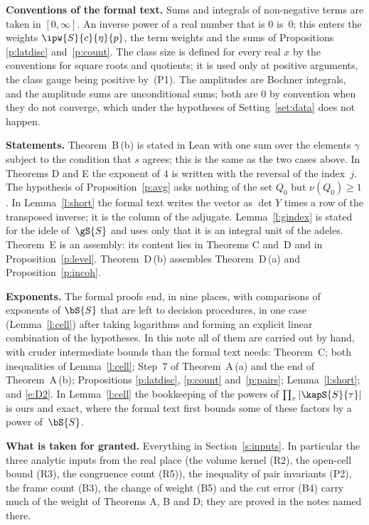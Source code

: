 \documentclass[11pt,a4paper]{article}
\newcommand{\m}[1]{\mbox{$#1$}}        %
\newcommand{\subhead}[1]{\par\addvspace{9pt plus 2pt}\Needspace{4\baselineskip}\noindent\textbf{#1}\enspace\ignorespaces}
\theoremstyle{plainx}
\theoremstyle{uprightx}
\renewcommand{\m}[1]{$#1$}
\newcommand{\bb}{\bS{S}}
\newcommand{\gq}{\gS{S}}
\newcommand{\inp}[1]{\textup{(#1)}}
\begin{document}
\subhead{Conventions of the formal text.} Sums and integrals of non-negative terms are taken in \m{[0,\infty]}.
An inverse power of a real number that is $0$ is~$0$; this enters the weights
\m{\ipw{S}{c}{\eta}{p}}, the term weights and the sums of Propositions \ref{p:latdisc} and~\ref{p:count}. The class
size is defined for every real $x$ by the conventions for square roots and quotients; it is used only at positive
arguments, the class gauge being positive by~\inp{P1}. The amplitudes are Bochner integrals, and the amplitude
sums are unconditional sums; both are $0$ by convention when they do not converge, which under the hypotheses of
Setting~\ref{set:data} does not happen.

\subhead{Statements.} Theorem~B\,(b) is stated in Lean with one sum over the elements $\gamma$ subject to the
condition that $s$ agrees; this is the same as the two cases above. In Theorems D and E the exponent of $4$ is
written with the reversal of the index~$j$. The hypothesis of Proposition~\ref{p:avg} asks nothing of the set
$Q_0$ but \m{\nu(Q_0)\ge1}. In Lemma~\ref{l:short} the formal text writes the vector as \m{\det Y} times a row of
the transposed inverse; it is the column of the adjugate. Lemma~\ref{l:gindex} is stated for the idele of~\m{\gq}
and uses only that it is an integral unit of the adeles. Theorem~E is an assembly: its content lies in Theorems
C and~D and in Proposition~\ref{p:level}. Theorem~D\,(b) assembles Theorem~D\,(a) and
Proposition~\ref{p:incoh}.

\subhead{Exponents.} The formal proofs end, in nine places, with comparisons of exponents of \m{\bb} that are left to
decision procedures, in one case (Lemma~\ref{l:cell}) after taking logarithms and forming an explicit linear
combination of the hypotheses. In this note all of them are carried out by hand, with cruder intermediate bounds
than the formal text needs: Theorem~C; both inequalities of Lemma~\ref{l:cell}; Step~7 of Theorem~A\,(a) and the
end of Theorem~A\,(b); Propositions \ref{p:latdisc}, \ref{p:count} and~\ref{p:pairs}; Lemma~\ref{l:short}; and
\eqref{e:D2}. In Lemma~\ref{l:cell} the bookkeeping of the powers of \m{\prod_\tau|\kapS{S}{\tau}|} is ours and exact,
where the formal text first bounds some of these factors by a power of~\m{\bb}.

\subhead{What is taken for granted.} Everything in Section~\ref{s:inputs}. In particular the three analytic
inputs from the real place (the volume kernel \inp{R2}, the open-cell bound \inp{R3}, the congruence count
\inp{R5}), the inequality of pair invariants \inp{P2}, the frame count \inp{B3}, the change of weight \inp{B5}
and the cut error \inp{B4} carry much of the weight of Theorems A, B and D; they are proved in the notes named
there.
\end{document}
